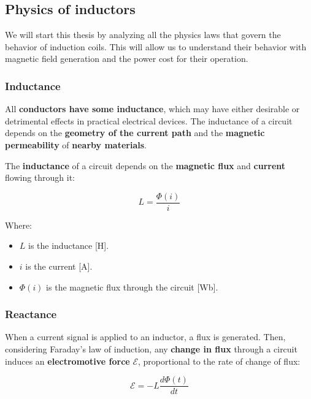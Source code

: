 \subsection{Physics of inductors}
We will start this thesis by analyzing all the physics laws that govern the behavior of induction coils. This will allow us to understand their behavior with magnetic field generation and the power cost for their operation. 
\subsubsection{Inductance}
All \textbf{conductors have some inductance}, which may have either desirable or detrimental effects in practical electrical devices. The inductance of a circuit depends on the \textbf{geometry of the current path} and the \textbf{magnetic permeability} of \textbf{nearby materials}.

\begin{samepage}
    The \textbf{inductance} of a circuit depends on the \textbf{magnetic flux} and \textbf{current} flowing through it:
    
    \nopagebreak

    \begin{equation*}
        L = \frac{\Phi(i)}{i} \label{eq: Inductance_&_flux}
    \end{equation*}

    \nopagebreak

    Where:
    \begin{itemize}
        \item $L$ is the inductance [H].
        \item $i$ is the current [A].
        \item $\Phi(i)$ is the magnetic flux through the circuit [Wb].
    \end{itemize}
\end{samepage}    

\subsubsection{Reactance}
When a current signal is applied to an inductor, a flux is generated.
Then, considering Faraday's law of induction, any \textbf{change in flux} through a circuit induces an \textbf{electromotive force} ${\mathcal {E}}$, proportional to the rate of change of flux:

\begin{equation*}
    {\mathcal {E}} = -L \frac{d\Phi(t)}{dt}
\end{equation*}

